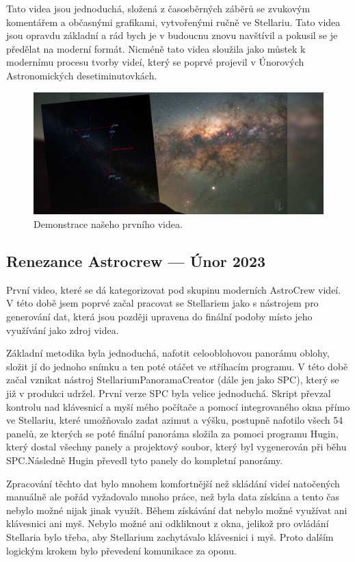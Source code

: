 \documentclass[12pt,a4paper,titlepage]{article}
\begin{document}
Tato videa jsou jednoduchá, složená z časosběrných záběrů se zvukovým komentářem a občasnými grafikami, vytvořenými ručně ve Stellariu. Tato videa jsou opravdu základní a rád bych je v budoucnu znovu navštívil a pokusil se je předělat na moderní formát. Nicméně tato videa sloužila jako můstek k modernímu procesu tvorby videí, který se poprvé projevil v Únorových Astronomických desetiminutovkách.

\begin{figure}[ht]
	\centering
	\includegraphics[width=.85\textwidth]{cervenec.png}
	\caption{Demonstrace našeho prvního videa.}\label{img:cervenec}
\end{figure}
\subsection{Renezance Astrocrew --- Únor 2023}
První video, které se dá kategorizovat pod skupinu moderních AstroCrew videí. V této době jsem poprvé začal pracovat se Stellariem jako s nástrojem pro generování dat, která jsou později upravena do finální podoby místo jeho využívání jako zdroj videa. 

Základní metodika byla jednoduchá, nafotit celooblohovou panorámu oblohy, složit jí do jednoho snímku a ten poté otáčet ve stříhacím programu. V této době začal vznikat nástroj StellariumPanoramaCreator (dále jen jako SPC), který se již v produkci udržel. První verze SPC byla velice jednoduchá. Skript převzal kontrolu nad klávesnicí a myší mého počítače a pomocí integrovaného okna přímo ve Stellariu, které umožňovalo zadat azimut a výšku, postupně nafotilo všech 54 panelů, ze kterých se poté finální panoráma složila za pomoci programu Hugin, který dostal všechny panely a projektový soubor, který byl vygenerován při běhu SPC.\@ Následně Hugin převedl tyto panely do kompletní panorámy.

Zpracování těchto dat bylo mnohem komfortnější než skládání videí natočených manuálně ale pořád vyžadovalo mnoho práce, než byla data získána a tento čas nebylo možné nijak jinak využít. Během získávání dat nebylo možné využívat ani klávesnici ani myš. Nebylo možné ani odkliknout z okna, jelikož pro ovládání Stellaria bylo třeba, aby Stellarium zachytávalo klávesnici i myš. Proto dalším logickým krokem bylo převedení komunikace za oponu. 
\end{document}
